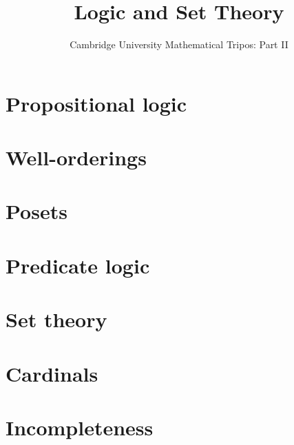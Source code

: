 \documentclass{article}
\title{Logic and Set Theory}
\author{Cambridge University Mathematical Tripos: Part II}
\begin{document}
\maketitle

\tableofcontentsnewpage{}

\section{Propositional logic}

\section{Well-orderings}

\section{Posets}

\section{Predicate logic}

\section{Set theory}

\section{Cardinals}

\section{Incompleteness}

\end{document}
